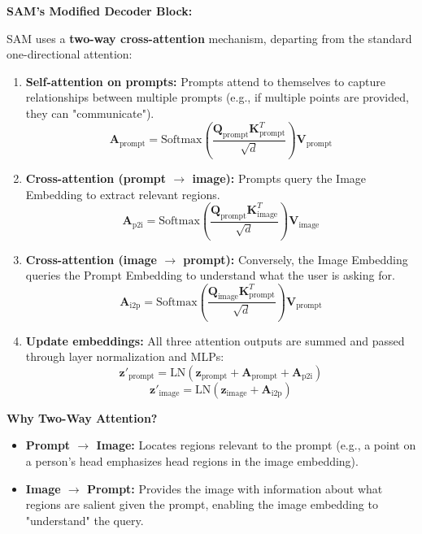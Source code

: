 \textbf{SAM's Modified Decoder Block:}

SAM uses a \textbf{two-way cross-attention} mechanism, departing from the standard one-directional attention:

\begin{enumerate}
    \item \textbf{Self-attention on prompts:} Prompts attend to themselves to capture relationships between multiple prompts (e.g., if multiple points are provided, they can "communicate").
       \[ \mathbf{A}_{\text{prompt}} = \text{Softmax}\left(\frac{\mathbf{Q}_{\text{prompt}} \mathbf{K}_{\text{prompt}}^T}{\sqrt{d}}\right) \mathbf{V}_{\text{prompt}} \]

    \item \textbf{Cross-attention (prompt $\rightarrow$ image):} Prompts query the Image Embedding to extract relevant regions.
       \[ \mathbf{A}_{\text{p2i}} = \text{Softmax}\left(\frac{\mathbf{Q}_{\text{prompt}} \mathbf{K}_{\text{image}}^T}{\sqrt{d}}\right) \mathbf{V}_{\text{image}} \]

    \item \textbf{Cross-attention (image $\rightarrow$ prompt):} Conversely, the Image Embedding queries the Prompt Embedding to understand what the user is asking for.
       \[ \mathbf{A}_{\text{i2p}} = \text{Softmax}\left(\frac{\mathbf{Q}_{\text{image}} \mathbf{K}_{\text{prompt}}^T}{\sqrt{d}}\right) \mathbf{V}_{\text{prompt}} \]

    \item \textbf{Update embeddings:} All three attention outputs are summed and passed through layer normalization and MLPs:
       \[ \mathbf{z}'_{\text{prompt}} = \text{LN}(\mathbf{z}_{\text{prompt}} + \mathbf{A}_{\text{prompt}} + \mathbf{A}_{\text{p2i}}) \]
       \[ \mathbf{z}'_{\text{image}} = \text{LN}(\mathbf{z}_{\text{image}} + \mathbf{A}_{\text{i2p}}) \]
\end{enumerate}

\textbf{Why Two-Way Attention?}

\begin{itemize}
    \item \textbf{Prompt $\rightarrow$ Image:} Locates regions relevant to the prompt (e.g., a point on a person's head emphasizes head regions in the image embedding).
    \item \textbf{Image $\rightarrow$ Prompt:} Provides the image with information about what regions are salient given the prompt, enabling the image embedding to "understand" the query.
\end{itemize}

